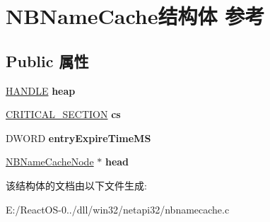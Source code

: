 \hypertarget{struct_n_b_name_cache}{}\section{N\+B\+Name\+Cache结构体 参考}
\label{struct_n_b_name_cache}
\subsection*{Public 属性}
\begin{DoxyCompactItemize}
\item 
\mbox{\label{struct_n_b_name_cache_a3cd9f9720929805f305c23984050410f}} 
\hyperlink{interfacevoid}{H\+A\+N\+D\+LE} {\bfseries heap}
\item 
\mbox{\label{struct_n_b_name_cache_a70878fe09ddc354ef4807bbb8beb0f53}} 
\hyperlink{struct___c_r_i_t_i_c_a_l___s_e_c_t_i_o_n}{C\+R\+I\+T\+I\+C\+A\+L\+\_\+\+S\+E\+C\+T\+I\+ON} {\bfseries cs}
\item 
\mbox{\label{struct_n_b_name_cache_a376ac9b6b91eee7e26057779e1b15576}} 
D\+W\+O\+RD {\bfseries entry\+Expire\+Time\+MS}
\item 
\mbox{\label{struct_n_b_name_cache_a971961db9edfe93f89906d4118dfb07f}} 
\hyperlink{struct___n_b_name_cache_node}{N\+B\+Name\+Cache\+Node} $\ast$ {\bfseries head}
\end{DoxyCompactItemize}


该结构体的文档由以下文件生成\+:\begin{DoxyCompactItemize}
\item 
E\+:/\+React\+O\+S-\/0../dll/win32/netapi32/nbnamecache.\+c\end{DoxyCompactItemize}
